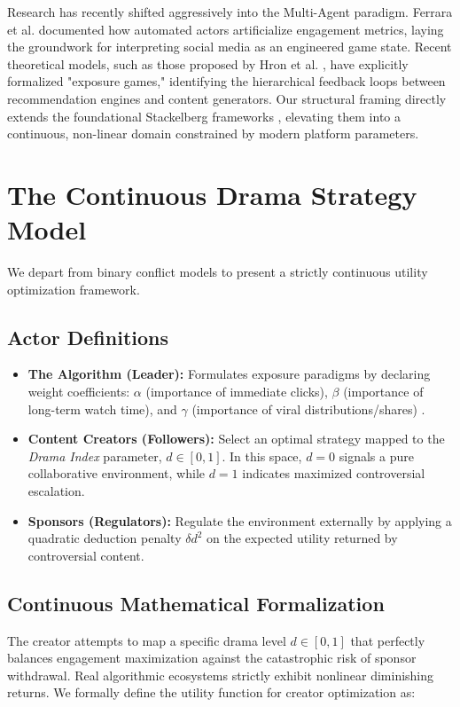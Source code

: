 \documentclass[12pt,letterpaper]{article}
\begin{document}
Research has recently shifted aggressively into the Multi-Agent paradigm. Ferrara et al. \cite{ferrara2016} documented how automated actors artificialize engagement metrics, laying the groundwork for interpreting social media as an engineered game state. Recent theoretical models, such as those proposed by Hron et al. \cite{hron2023modeling}, have explicitly formalized "exposure games," identifying the hierarchical feedback loops between recommendation engines and content generators. Our structural framing directly extends the foundational Stackelberg frameworks \cite{stackelberg1934, osborne1994course}, elevating them into a continuous, non-linear domain constrained by modern platform parameters.

\section{The Continuous Drama Strategy Model}
We depart from binary conflict models to present a strictly continuous utility optimization framework.

\subsection{Actor Definitions}
\begin{itemize}
\item \textbf{The Algorithm (Leader):} Formulates exposure paradigms by declaring weight coefficients: $\alpha$ (importance of immediate clicks), $\beta$ (importance of long-term watch time), and $\gamma$ (importance of viral distributions/shares) \cite{zheng2023agency}.
\item \textbf{Content Creators (Followers):} Select an optimal strategy mapped to the \textit{Drama Index} parameter, $d \in [0, 1]$. In this space, $d=0$ signals a pure collaborative environment, while $d=1$ indicates maximized controversial escalation.
\item \textbf{Sponsors (Regulators):} Regulate the environment externally by applying a quadratic deduction penalty $\delta d^2$ on the expected utility returned by controversial content.
\end{itemize}

\subsection{Continuous Mathematical Formalization}
The creator attempts to map a specific drama level $d \in [0, 1]$ that perfectly balances engagement maximization against the catastrophic risk of sponsor withdrawal. Real algorithmic ecosystems strictly exhibit nonlinear diminishing returns. We formally define the utility function for creator optimization as:
\end{document}
